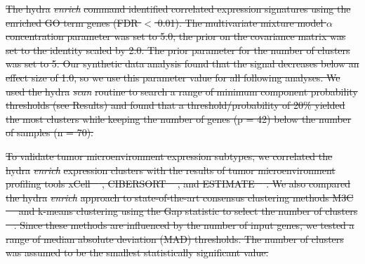 \documentclass[10pt,letterpaper]{article}
\providecommand{\DIFdeltex}[1]{{\protect\color{red}\sout{#1}}}                      %
\providecommand{\DIFdel}[1]{\texorpdfstring{\DIFdeltex{#1}}{}} %
\begin{document}
\DIFdel{The hydra }\textit{\DIFdel{enrich}} %
\DIFdel{command identified correlated expression signatures using the enriched GO term genes (FDR $<$ 0.01). The multivariate mixture model $\alpha$ concentration parameter was set to 5.0; the prior on the covariance matrix was set to the identity scaled by 2.0. The prior parameter for the number of clusters was set to 5. Our synthetic data analysis found that the signal decreases below an effect size of 1.0, so we use this parameter value for all following analyses. We used the hydra }\textit{\DIFdel{scan}} %
\DIFdel{routine to search a range of minimum component probability thresholds (see Results) and found that a threshold/probability of 20\% yielded the most clusters while keeping the number of genes (p = 42) below the number of samples (n = 70).
}%

\DIFdel{To validate tumor microenvironment expression subtypes, we correlated the hydra }\textit{\DIFdel{enrich}} %
\DIFdel{expression clusters with the results of tumor microenvironment profiling tools xCell \mbox{%
\cite{aranXCellDigitallyPortraying2017}}\hspace{0pt}%
, CIBERSORT \mbox{%
\cite{newmanRobustEnumerationCell2015}}\hspace{0pt}%
, and ESTIMATE \mbox{%
\cite{yoshiharaInferringTumourPurity2013a}}\hspace{0pt}%
. We also compared the hydra }\textit{\DIFdel{enrich}} %
\DIFdel{approach to state-of-the-art consensus clustering methods M3C \mbox{%
\cite{johnM3CMonteCarlo2018} }\hspace{0pt}%
and k-means clustering using the Gap statistic to select the number of clusters \mbox{%
\cite{tibshirani2001estimating}}\hspace{0pt}%
. Since these methods are influenced by the number of input genes, we tested a range of median absolute deviation (MAD) thresholds. The number of clusters was assumed to be the smallest statistically significant value.
}%

\end{document}
